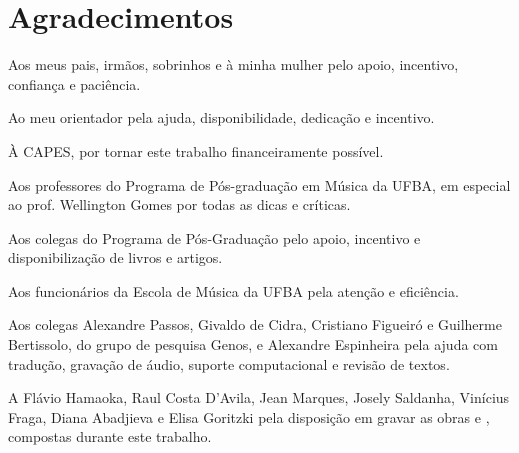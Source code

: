 \chapter*{Agradecimentos}
\label{cha:agradecimentos}

Aos meus pais, irmãos, sobrinhos e à minha mulher pelo apoio,
incentivo, confiança e paciência.

Ao meu orientador pela ajuda, disponibilidade, dedicação e incentivo.

À CAPES, por tornar este trabalho financeiramente possível.

Aos professores do Programa de Pós-graduação em Música da UFBA, em
especial ao prof. Wellington Gomes por todas as dicas e críticas.

Aos colegas do Programa de Pós-Graduação pelo apoio, incentivo e
disponibilização de livros e artigos.

Aos funcionários da Escola de Música da UFBA pela atenção e
eficiência.

Aos colegas Alexandre Passos, Givaldo de Cidra, Cristiano Figueiró e
Guilherme Bertissolo, do grupo de pesquisa Genos, e Alexandre
Espinheira pela ajuda com tradução, gravação de áudio, suporte
computacional e revisão de textos.

A Flávio Hamaoka, Raul Costa D'Avila, Jean Marques, Josely Saldanha,
Vinícius Fraga, Diana Abadjieva e Elisa Goritzki pela disposição em
gravar as obras  e \obra{}, compostas
durante este trabalho.
